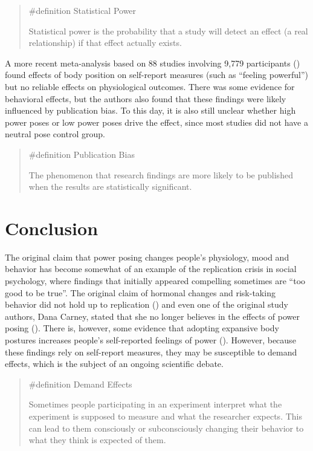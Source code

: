 \documentclass[
  letterpaper,
]{book}
\begin{document}
\begin{quote}
\label{def-statisticalpower}{\#definition} Statistical
Power

Statistical power is the probability that a study will detect an effect
(a real relationship) if that effect actually exists.
\end{quote}

A more recent meta-analysis based on 88 studies involving 9,779
participants ()
found effects of body position on self-report measures (such as
``feeling powerful'') but no reliable effects on physiological outcomes.
There was some evidence for behavioral effects, but the authors also
found that these findings were likely influenced by publication bias. To
this day, it is also still unclear whether high power poses or low power
poses drive the effect, since most studies did not have a neutral pose
control group.

\begin{quote}
\label{def-publicationbias}{\#definition} Publication
Bias

The phenomenon that research findings are more likely to be published
when the results are statistically significant.
\end{quote}

\section{Conclusion}\label{conclusion-26}

The original claim that power posing changes people's physiology, mood
and behavior has become somewhat of an example of the replication crisis
in social psychology, where findings that initially appeared compelling
sometimes are ``too good to be true''. The original claim of hormonal
changes and risk-taking behavior did not hold up to replication
() and
even one of the original study authors, Dana Carney, stated that she no
longer believes in the effects of power posing
(). There is, however, some
evidence that adopting expansive body postures increases people's
self-reported feelings of power
(). However,
because these findings rely on self-report measures, they may be
susceptible to demand effects, which is the subject of an ongoing
scientific debate.

\begin{quote}
\label{def-demandeffects}{\#definition} Demand Effects

Sometimes people participating in an experiment interpret what the
experiment is supposed to measure and what the researcher expects. This
can lead to them consciously or subconsciously changing their behavior
to what they think is expected of them.
\end{quote}
\end{document}
